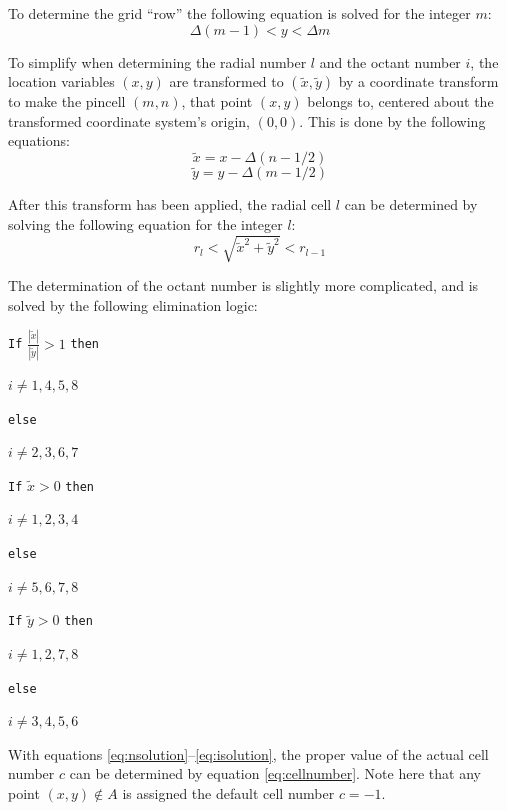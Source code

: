 \documentclass{article}
\begin{document}
To determine the grid ``row'' the following equation is solved for the integer $m$:
\begin{equation}
\Delta (m-1)<y<\Delta m
\label{eq:msolution}
\end{equation}

To simplify when determining the radial number $l$ and the octant number $i$, the location variables $(x,y)$ are transformed to $(\tilde{x},\tilde{y})$ by a coordinate transform to make the pincell $(m,n)$, that point $(x,y)$ belongs to, centered about the transformed coordinate system's origin, $(0,0)$. 
This is done by the following equations:
\begin{equation}
\tilde{x}=x-\Delta (n-1/2)
\label{eq:xtransform}
\end{equation}
\begin{equation}
\tilde{y}=y-\Delta (m-1/2)
\label{eq:ytransform}
\end{equation}

After this transform has been applied, the radial cell $l$ can be determined by solving the following equation for the integer $l$:
\begin{equation}
r_l<\sqrt{\tilde{x}^2+\tilde{y}^2}<r_{l-1}
\label{eq:lsolution}
\end{equation}

The determination of the octant number is slightly more complicated, and is solved by the following elimination logic:

\vspace{5mm}
\texttt{If} $\frac{|\tilde{x}|}{|\tilde{y}|} > 1$ \texttt{then}

\qquad $i\ne 1, 4, 5, 8$

\texttt{else}

\qquad $i\ne 2, 3, 6, 7$

\texttt{If} $\tilde{x} > 0$ \texttt{then}

\qquad $i\ne 1, 2, 3, 4$

\texttt{else}

\qquad $i\ne 5, 6, 7, 8$

\texttt{If} $\tilde{y} > 0$ \texttt{then}

\qquad $i\ne 1, 2, 7, 8$

\texttt{else}

\qquad $i\ne 3, 4, 5, 6$
\begin{equation}
\label{eq:isolution}
\end{equation}

With equations \ref{eq:nsolution}--\ref{eq:isolution}, the proper value of the actual cell number $c$ can be determined by equation \ref{eq:cellnumber}. 
Note here that any point $(x,y)\notin A$ is assigned the default cell number $c=-1$.
\end{document}
